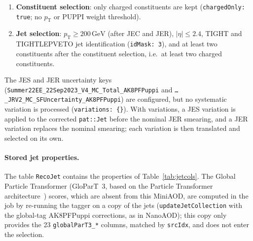 \documentclass[11pt]{article}
\newcommand{\pt}{p_{\mathrm{T}}}
\newcommand{\GeV}{\ensuremath{\,\mathrm{GeV}}}
\newcommand{\code}[1]{\texttt{#1}}
\begin{document}
\begin{enumerate}
  prescribes for MiniAOD. The CMSSW functor \code{PFJetIDSelectionFunctor} is not used: in CMSSW\_15\_0\_22 its
  TIGHTLEPVETO criteria for \code{RUN3PUPPIruns2022FGruns2023CD} keep a neutral hadron fraction below 0.90 (the
  assignment of 0.99 sits in an \code{else if} branch that is never reached), whereas the POG table and the TIGHT
  criteria use 0.99, and it applies no lepton veto for $2.6 \leq |\eta| < 2.7$. On the 69\,298 reco jets of the seven
  cutflow samples, the functor and the correctionlib file disagreed for 8 jets in TightLeptonVeto (2 of them at
  $|\eta| \leq 2.4$) and for 1 jet in Tight, whose stored charged hadron fraction lies at the 0.01 boundary.
\item \textbf{Constituent selection}: only charged constituents are kept (\code{chargedOnly: true}; no $\pt$ or PUPPI
  weight threshold).
\item \textbf{Jet selection}: $\pt \geq 200\GeV$ (after JEC and JER), $|\eta| \leq 2.4$, TIGHT and TIGHTLEPVETO jet
  identification (\code{idMask: 3}), and at least two constituents after the constituent selection, i.e.\ at least two
  charged constituents.
\end{enumerate}
The JES and JER uncertainty keys (\code{Summer22EE\_22Sep2023\_V4\_MC\_Total\_AK8PFPuppi} and
\code{\dots\_JRV2\_MC\_SFUncertainty\_AK8PFPuppi}) are configured, but no systematic variation is processed
(\code{variations: \{\}}). With variations, a JES variation is applied to the corrected \code{pat::Jet} before the
nominal JER smearing, and a JER variation replaces the nominal smearing; each variation is then translated and
selected on its own.

\paragraph{Stored jet properties.} The table \code{RecoJet} contains the properties of
Table~\ref{tab:jetcols}. The Global Particle Transformer (GloParT~3, based on the Particle Transformer
architecture~\cite{Qu:2022mxj}) scores, which are absent from this MiniAOD, are computed in the job by re-running the
tagger on a copy of the jets (\code{updateJetCollection} with the global-tag AK8PFPuppi corrections, as in NanoAOD);
this copy only provides the 23 \code{globalParT3\_*} columns, matched by \code{srcIdx}, and does not enter the
selection.
\end{document}
